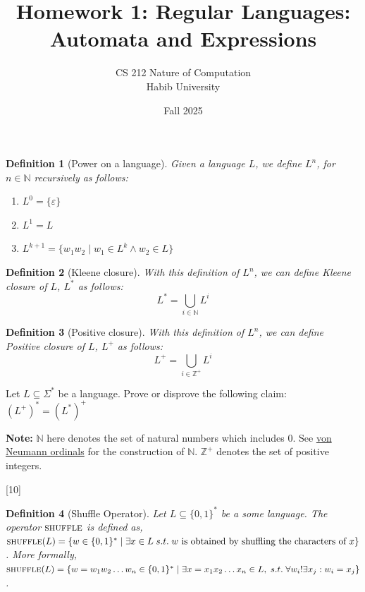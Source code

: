 \documentclass[a4paper]{exam}
\title{Homework 1: Regular Languages: Automata and Expressions}
\author{CS 212 Nature of Computation\\Habib University}
\date{Fall 2025}
\newcommand{\shuffle}{\textsc{shuffle}} %
\newtheorem{definition}{Definition}
\begin{document}
\maketitle


\begin{questions}
    \question[10]
    \begin{definition}[Power on a language]
        Given a language $L$, we define $L^n$, for $n \in \mathbb{N}$ recursively as follows:
        \begin{enumerate}
            \item $L^0 = \{\varepsilon\}$ 
            \item $L^1 = L$
            \item $L^{k+1} = \{w_1w_2\mid w_1 \in L^k \land w_2 \in L\}$
        \end{enumerate}
    \end{definition}
    \begin{definition}[Kleene closure]
        With this definition of $L^n$, we can define Kleene closure of $L$, $L^*$ as follows:
        $$L^*=\bigcup_{i \in \mathbb{N}} L^i$$
    \end{definition}
    \begin{definition}[Positive closure]
        With this definition of $L^n$, we can define Positive closure of $L$, $L^+$ as follows:
        $$L^+=\bigcup_{i \in \mathbb{Z}^+} L^i$$
    \end{definition}
    
    Let $L \subseteq \Sigma^*$ be a language. Prove or disprove the following claim:
    $(L^+)^*=(L^*)^+$
    
    \begin{solution}
    \end{solution}
    
    \textbf{Note:} $\mathbb{N}$ here denotes the set of natural numbers which includes 0. See \href{https://en.wikipedia.org/wiki/Set-theoretic_definition_of_natural_numbers}{von Neumann ordinals} for the construction of $\mathbb{N}$.
    $\mathbb{Z}^+$ denotes the set of positive integers.

    [10]

    \begin{definition}[Shuffle Operator]
        Let $L \subseteq \{0,1\}^*$ be a some language. The operator $\shuffle$ is defined as, $\shuffle(L) = \{w\in \{0,1\}^*\mid \exists x \in L \;s.t. \; w \text{ is obtained by shuffling the characters of } x\}$. More formally, $\shuffle(L) = \{w = w_1w_2\dots w_n\in \{0,1\}^*\mid \exists x = x_1x_2 \dots x_n \in L, \;s.t.\; \forall w_i !\exists x_j : w_i = x_j\}$. 
    \end{definition}
    

\end{questions}
\end{document}
